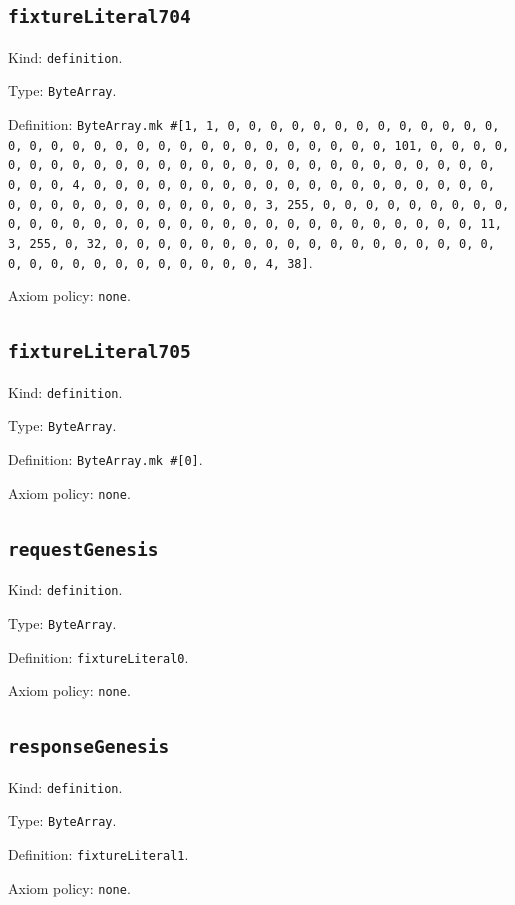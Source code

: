 \documentclass[11pt]{article}
\begin{document}
\subsection*{\texttt{fixtureLiteral704}}
\noindent Kind: \texttt{definition}.\par
\noindent Type: \texttt{ByteArray}.\par
\noindent Definition: \texttt{ByteArray.mk \#[1, 1, 0, 0, 0, 0, 0, 0, 0, 0, 0, 0, 0, 0, 0, 0, 0, 0, 0, 0, 0, 0, 0, 0, 0, 0, 0, 0, 0, 0, 0, 0, 0, 101, 0, 0, 0, 0, 0, 0, 0, 0, 0, 0, 0, 0, 0, 0, 0, 0, 0, 0, 0, 0, 0, 0, 0, 0, 0, 0, 0, 0, 0, 0, 4, 0, 0, 0, 0, 0, 0, 0, 0, 0, 0, 0, 0, 0, 0, 0, 0, 0, 0, 0, 0, 0, 0, 0, 0, 0, 0, 0, 0, 0, 0, 0, 3, 255, 0, 0, 0, 0, 0, 0, 0, 0, 0, 0, 0, 0, 0, 0, 0, 0, 0, 0, 0, 0, 0, 0, 0, 0, 0, 0, 0, 0, 0, 0, 0, 11, 3, 255, 0, 32, 0, 0, 0, 0, 0, 0, 0, 0, 0, 0, 0, 0, 0, 0, 0, 0, 0, 0, 0, 0, 0, 0, 0, 0, 0, 0, 0, 0, 0, 0, 4, 38]}.\par
\noindent Axiom policy: \texttt{none}.\par
\subsection*{\texttt{fixtureLiteral705}}
\noindent Kind: \texttt{definition}.\par
\noindent Type: \texttt{ByteArray}.\par
\noindent Definition: \texttt{ByteArray.mk \#[0]}.\par
\noindent Axiom policy: \texttt{none}.\par
\subsection*{\texttt{requestGenesis}}
\noindent Kind: \texttt{definition}.\par
\noindent Type: \texttt{ByteArray}.\par
\noindent Definition: \texttt{fixtureLiteral0}.\par
\noindent Axiom policy: \texttt{none}.\par
\subsection*{\texttt{responseGenesis}}
\noindent Kind: \texttt{definition}.\par
\noindent Type: \texttt{ByteArray}.\par
\noindent Definition: \texttt{fixtureLiteral1}.\par
\noindent Axiom policy: \texttt{none}.\par
\end{document}
